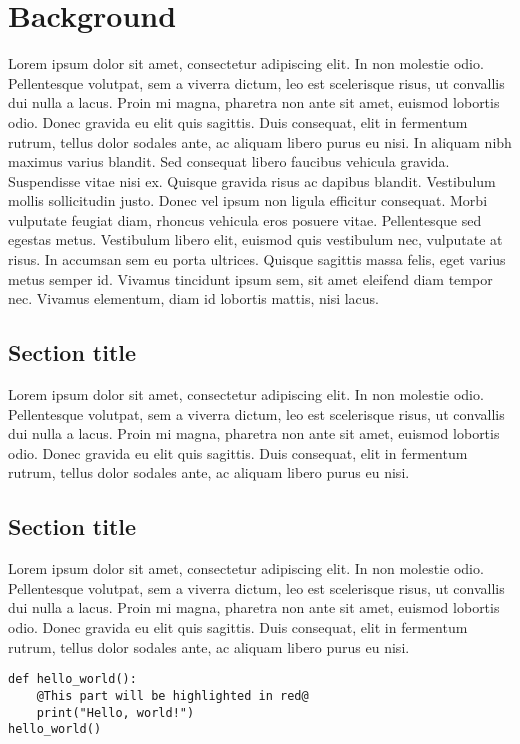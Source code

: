 \chapter{Background}

Lorem ipsum dolor sit amet, consectetur adipiscing elit. In non molestie odio. Pellentesque volutpat, sem a viverra dictum, leo est scelerisque risus, ut convallis dui nulla a lacus. Proin mi magna, pharetra non ante sit amet, euismod lobortis odio. Donec gravida eu elit quis sagittis. Duis consequat, elit in fermentum rutrum, tellus dolor sodales ante, ac aliquam libero purus eu nisi. In aliquam nibh maximus varius blandit. Sed consequat libero faucibus vehicula gravida. Suspendisse vitae nisi ex. Quisque gravida risus ac dapibus blandit. Vestibulum mollis sollicitudin justo. Donec vel ipsum non ligula efficitur consequat. Morbi vulputate feugiat diam, rhoncus vehicula eros posuere vitae. Pellentesque sed egestas metus. Vestibulum libero elit, euismod quis vestibulum nec, vulputate at risus. In accumsan sem eu porta ultrices. Quisque sagittis massa felis, eget varius metus semper id. Vivamus tincidunt ipsum sem, sit amet eleifend diam tempor nec. Vivamus elementum, diam id lobortis mattis, nisi lacus. 

\section{Section title}
Lorem ipsum dolor sit amet, consectetur adipiscing elit. In non molestie odio. Pellentesque volutpat, sem a viverra dictum, leo est scelerisque risus, ut convallis dui nulla a lacus.  Proin mi magna, pharetra non ante sit amet, euismod lobortis odio. Donec gravida eu elit quis sagittis. Duis consequat, elit in fermentum rutrum, tellus dolor sodales ante, ac aliquam libero purus eu nisi. 

\section{Section title}
Lorem ipsum dolor sit amet, consectetur adipiscing elit. In non molestie odio. Pellentesque volutpat, sem a viverra dictum, leo est scelerisque risus, ut convallis dui nulla a lacus. Proin mi magna, pharetra non ante sit amet, euismod lobortis odio. Donec gravida eu elit quis sagittis. Duis consequat, elit in fermentum rutrum, tellus dolor sodales ante, ac aliquam libero purus eu nisi. 


\begin{lstlisting}[caption = Python Code Example]
def hello_world():
    @This part will be highlighted in red@
    print("Hello, world!")
hello_world()
\end{lstlisting}

